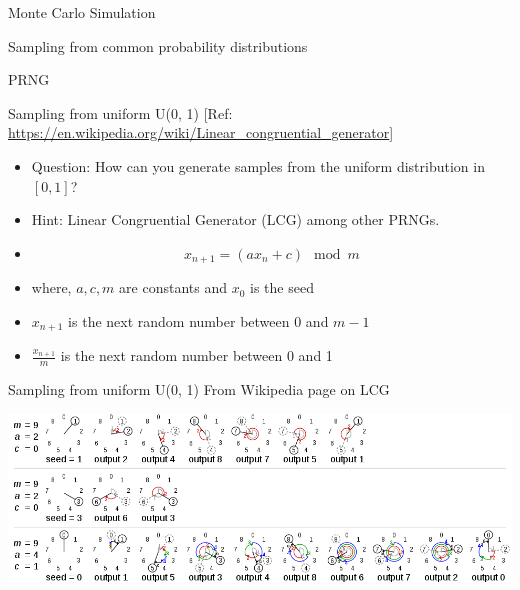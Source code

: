 \documentclass{beamer}
\begin{document}
\begin{section}{Monte Carlo Simulation}

    
\end{section}


\begin{section}{Sampling from common probability distributions}
    \begin{subsection}{PRNG}

    \begin{frame}{Sampling from uniform U(0, 1)}
        [Ref: \url{https://en.wikipedia.org/wiki/Linear_congruential_generator}]
        
    
    \begin{itemize}
        \item Question: How can you generate samples from the uniform distribution in $[0, 1]$?
        \item \pause Hint: Linear Congruential Generator (LCG) among other PRNGs.
        \item \pause \begin{equation}
            x_{n+1} = (a x_n + c) \mod m
        \end{equation}
        \item  where, $a, c, m$ are constants and $x_0$ is the seed
        \item $x_{n+1}$ is the next random number between 0 and $m-1$
        \item \pause $\frac{x_{n+1}}{m}$ is the next random number between 0 and 1
    

    \end{itemize}
\end{frame}

\begin{frame}{Sampling from uniform U(0, 1)}
    From Wikipedia page on LCG

    \includegraphics[width=\columnwidth]{../figures/wiki-LCG.png}
    

\end{frame}
\end{subsection}
\end{section}
\end{document}
